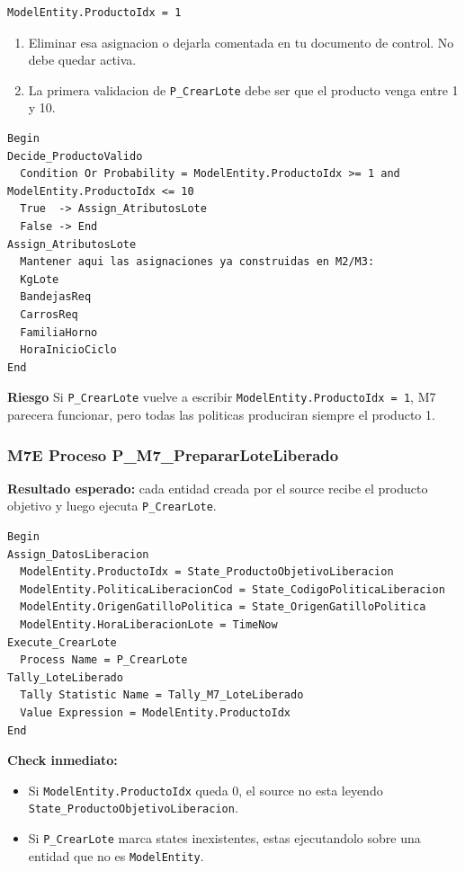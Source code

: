 \documentclass[11pt]{article}
\newcommand{\simio}[1]{\texttt{#1}}
\newcommand{\state}[1]{\texttt{#1}}
\newcommand{\proc}[1]{\texttt{#1}}
\newcommand{\risk}{\textcolor{rojoriesgo}{\textbf{Riesgo}}}
\begin{document}
\begin{lstlisting}[caption={Linea que debe eliminarse o desactivarse en P CrearLote}]
ModelEntity.ProductoIdx = 1
\end{lstlisting}

\begin{enumerate}[resume]
  \item Eliminar esa asignacion o dejarla comentada en tu documento de control. No debe quedar activa.
  \item La primera validacion de \proc{P\_CrearLote} debe ser que el producto venga entre 1 y 10.
\end{enumerate}

\begin{lstlisting}[caption={Bloques iniciales obligatorios de P CrearLote desde M7}]
Begin
Decide_ProductoValido
  Condition Or Probability = ModelEntity.ProductoIdx >= 1 and ModelEntity.ProductoIdx <= 10
  True  -> Assign_AtributosLote
  False -> End
Assign_AtributosLote
  Mantener aqui las asignaciones ya construidas en M2/M3:
  KgLote
  BandejasReq
  CarrosReq
  FamiliaHorno
  HoraInicioCiclo
End
\end{lstlisting}

\risk{} Si \proc{P\_CrearLote} vuelve a escribir \state{ModelEntity.ProductoIdx = 1}, M7 parecera funcionar, pero todas las politicas produciran siempre el producto 1.

\subsubsection{M7E Proceso P\_M7\_PrepararLoteLiberado}
\textbf{Resultado esperado:} cada entidad creada por el source recibe el producto objetivo y luego ejecuta \proc{P\_CrearLote}.

\begin{lstlisting}[caption={Bloques de P M7 PrepararLoteLiberado}]
Begin
Assign_DatosLiberacion
  ModelEntity.ProductoIdx = State_ProductoObjetivoLiberacion
  ModelEntity.PoliticaLiberacionCod = State_CodigoPoliticaLiberacion
  ModelEntity.OrigenGatilloPolitica = State_OrigenGatilloPolitica
  ModelEntity.HoraLiberacionLote = TimeNow
Execute_CrearLote
  Process Name = P_CrearLote
Tally_LoteLiberado
  Tally Statistic Name = Tally_M7_LoteLiberado
  Value Expression = ModelEntity.ProductoIdx
End
\end{lstlisting}

\textbf{Check inmediato:}
\begin{itemize}
  \item Si \state{ModelEntity.ProductoIdx} queda 0, el source no esta leyendo \state{State\_ProductoObjetivoLiberacion}.
  \item Si \proc{P\_CrearLote} marca states inexistentes, estas ejecutandolo sobre una entidad que no es \simio{ModelEntity}.
\end{itemize}
\end{document}
